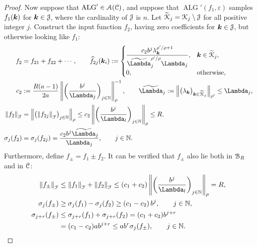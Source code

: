 \documentclass[USenglish]{article}
\theoremstyle{dgthm}
\theoremstyle{dgthm}
\theoremstyle{dgthm}
\theoremstyle{dgthm}
\theoremstyle{dgdef}
\DeclareMathOperator{\ALG}{ALG}
\newcommand{\hf}{\widehat{f}}
\newcommand{\tcalK}{\widetilde{\calK}}
\newcommand{\norm}[2][{}]{\ensuremath{\left \lVert #2 \right \rVert}_{#1}}
\newcommand{\tLambda}{\widetilde{\Lambda}}
\begin{document}
\begin{proof}
Now suppose that $\ALG' \in \calA(\calC)$, and suppose that $\ALG'(f_1,\varepsilon)$ samples $f_1({\boldsymbol{k}})$ for ${\boldsymbol{k}} \in {\mathcal{J}}$, where the cardinality of ${\mathcal{J}}$ is $n$.  Let $\tcalK_j = \calK_j \setminus \calJ$ for all positive integer $j$. Construct the input function $f_2$, having zero coefficients for ${\boldsymbol{k}} \in {\mathcal{J}}$, but otherwise looking like $f_1$:
\begin{align}
\nonumber
f_2 &= f_{21} + f_{22} +  \cdots, \qquad \hf_{2j}(\bsk_i) := \begin{cases}
\displaystyle
\frac{c_2 b^{j} \lambda_{\bsk}^{\rho'/\rho+1}}{\tLambda_j^{\rho'/\rho} \Lambda_j},  
& \bsk \in \tcalK_j,
\\
0, & \text{otherwise},
\end{cases}
\\
\nonumber
c_2 &:= \frac{R(a-1)}{2a} \norm[\rho]{ \biggl(\frac{b^{j}}{\Lambda_j} \biggr)_{j \in \N}}^{-1}, \qquad
\tLambda_j := \norm[\rho']{\bigl(\lambda_\bsk \bigr)_{\bsk \in \tcalK_j}} \le \Lambda_j, \\
\norm[\calF]{f_2} &= \norm[\rho]{\bigl( \norm[\calF]{f_{2j}} \bigr)_{j \in \N} } 
\le  c_2 \norm[\rho]{ \biggl(\frac{b^{j}}{\Lambda_l} \biggr)_{j \in \N} } \le R, \\
\sigma_j(f_2) &= \sigma_j(f_{2j}) = 
\frac{c_2 b^{j}\tLambda_j}{\Lambda_j} , \qquad j \in \N.
\end{align}
Furthermore, define $f_{\pm} = f_1 \pm f_2$.
It can be verified that $f_{\pm}$ also lie both in ${\mathcal{B}}_{R}$ and in ${\mathcal{C}}$:
\begin{align}
\nonumber
\norm[\calF]{f_\pm} &\le \norm[\calF]{f_1} + \norm[\calF]{f_2} \le (c_1 + c_2) \norm[\rho]{ \biggl(\frac{b^{j}}{\Lambda_l} \biggr)_{j \in \N} } = R,
\\
\nonumber
\sigma_j(f_\pm) & \ge \sigma_j(f_1) - \sigma_j(f_2) \ge
\left(c_1 - c_2 \right) b^{j},  \qquad j \in \N,
\\
\nonumber
\sigma_{j+r}(f_\pm) & \le \sigma_{j+r}(f_1) + \sigma_{j+r}(f_2) = 
(c_1+c_2) b^{j+r}
\\
\nonumber
& = (c_1 - c_2) a b^{j+r}
\le a b^r \sigma_j(f_\pm),  \qquad j \in \N.
\end{align}


\end{proof}
\end{document}
